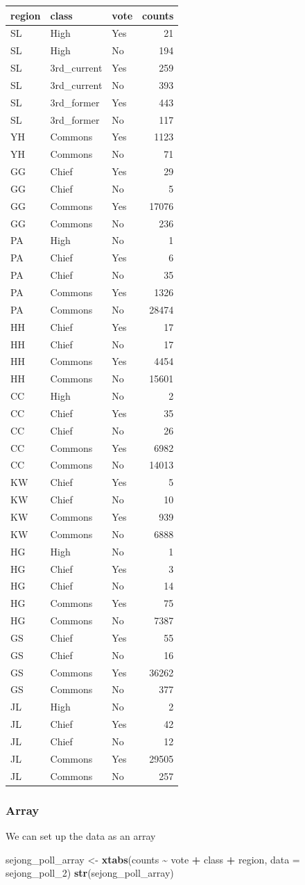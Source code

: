 \documentclass[
]{article}
\newenvironment{Shaded}{\begin{snugshade}}{\end{snugshade}}
\newcommand{\DataTypeTok}[1]{\textcolor[rgb]{0.13,0.29,0.53}{#1}}
\newcommand{\DecValTok}[1]{\textcolor[rgb]{0.00,0.00,0.81}{#1}}
\newcommand{\KeywordTok}[1]{\textcolor[rgb]{0.13,0.29,0.53}{\textbf{#1}}}
\newcommand{\NormalTok}[1]{#1}
\newcommand{\OperatorTok}[1]{\textcolor[rgb]{0.81,0.36,0.00}{\textbf{#1}}}
\newcommand{\StringTok}[1]{\textcolor[rgb]{0.31,0.60,0.02}{#1}}
\begin{document}
\begin{longtable}[]{@{}lllr@{}}
\toprule
region & class & vote & counts\tabularnewline
\midrule
\endhead
SL & High & Yes & 21\tabularnewline
SL & High & No & 194\tabularnewline
SL & 3rd\_current & Yes & 259\tabularnewline
SL & 3rd\_current & No & 393\tabularnewline
SL & 3rd\_former & Yes & 443\tabularnewline
SL & 3rd\_former & No & 117\tabularnewline
YH & Commons & Yes & 1123\tabularnewline
YH & Commons & No & 71\tabularnewline
GG & Chief & Yes & 29\tabularnewline
GG & Chief & No & 5\tabularnewline
GG & Commons & Yes & 17076\tabularnewline
GG & Commons & No & 236\tabularnewline
PA & High & No & 1\tabularnewline
PA & Chief & Yes & 6\tabularnewline
PA & Chief & No & 35\tabularnewline
PA & Commons & Yes & 1326\tabularnewline
PA & Commons & No & 28474\tabularnewline
HH & Chief & Yes & 17\tabularnewline
HH & Chief & No & 17\tabularnewline
HH & Commons & Yes & 4454\tabularnewline
HH & Commons & No & 15601\tabularnewline
CC & High & No & 2\tabularnewline
CC & Chief & Yes & 35\tabularnewline
CC & Chief & No & 26\tabularnewline
CC & Commons & Yes & 6982\tabularnewline
CC & Commons & No & 14013\tabularnewline
KW & Chief & Yes & 5\tabularnewline
KW & Chief & No & 10\tabularnewline
KW & Commons & Yes & 939\tabularnewline
KW & Commons & No & 6888\tabularnewline
HG & High & No & 1\tabularnewline
HG & Chief & Yes & 3\tabularnewline
HG & Chief & No & 14\tabularnewline
HG & Commons & Yes & 75\tabularnewline
HG & Commons & No & 7387\tabularnewline
GS & Chief & Yes & 55\tabularnewline
GS & Chief & No & 16\tabularnewline
GS & Commons & Yes & 36262\tabularnewline
GS & Commons & No & 377\tabularnewline
JL & High & No & 2\tabularnewline
JL & Chief & Yes & 42\tabularnewline
JL & Chief & No & 12\tabularnewline
JL & Commons & Yes & 29505\tabularnewline
JL & Commons & No & 257\tabularnewline
\bottomrule
\end{longtable}

\hypertarget{array}{%
\subsubsection{Array}\label{array}}

We can set up the data as an array

\begin{Shaded}
\begin{Highlighting}[]
\NormalTok{sejong\_poll\_array \textless{}{-}}\StringTok{ }\KeywordTok{xtabs}\NormalTok{(counts }\OperatorTok{\textasciitilde{}}\StringTok{ }\NormalTok{vote }\OperatorTok{+}\StringTok{ }\NormalTok{class }\OperatorTok{+}\StringTok{ }\NormalTok{region, }
                           \DataTypeTok{data =}\NormalTok{ sejong\_poll\_}\DecValTok{2}\NormalTok{)}
\KeywordTok{str}\NormalTok{(sejong\_poll\_array)}
\end{Highlighting}
\end{Shaded}
\end{document}
